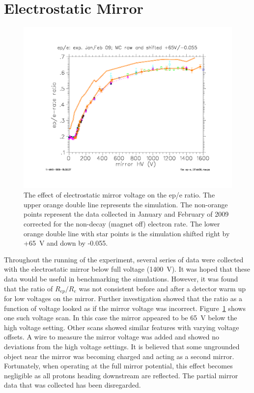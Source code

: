 \documentclass[oneside,12pt]{memoir}
\begin{document}
\section{Electrostatic Mirror}
\label{sec:mirror_syst}
\begin{figure}[t]
	\includegraphics[width=\textwidth]{mirror_ep_e.png}
	\caption[Effect of electrostatic mirror voltage on the ep/e ratio.]{The effect of electrostatic mirror voltage on the ep/e ratio. The upper orange double line represents the simulation. The non-orange points represent the data collected in January and February of 2009 corrected for the non-decay (magnet off) electron rate. The lower orange double line with star points is the simulation shifted right by +65~V and down by -0.055.}
	\label{fig:mirror_ep_e}
\end{figure}
Throughout the running of the experiment, several series of data were collected with the electrostatic mirror below full voltage (1400~V). It was hoped that these data would be useful in benchmarking the simulations. However, it was found that the ratio of $R_{ep}/R_e$ was not consistent before and after a detector warm up for low voltages on the mirror. Further investigation showed that the ratio as a function of voltage looked as if the mirror voltage was incorrect. Figure~\ref{fig:mirror_ep_e} shows one such voltage scan. In this case the mirror appeared to be 65~V below the high voltage setting. Other scans showed similar features with varying voltage offsets. A wire to measure the mirror voltage was added and showed no deviations from the high voltage settings. It is believed that some ungrounded object near the mirror was becoming charged and acting as a second mirror. Fortunately, when operating at the full mirror potential, this effect becomes negligible as all protons heading downstream are reflected. The partial mirror data that was collected has been disregarded.
\end{document}

